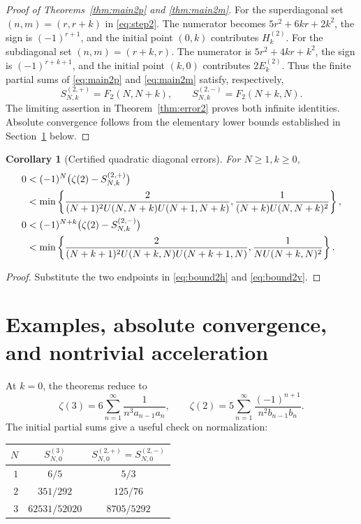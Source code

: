 \documentclass[11pt]{article}
\numberwithin{equation}{section}
\newtheorem{corollary}[theorem]{Corollary}
\theoremstyle{definition}
\theoremstyle{remark}
\newcommand{\HS}[2]{H_{#1}^{(#2)}}
\newcommand{\ES}[1]{E_{#1}^{(2)}}
\newcommand{\Sthree}[2]{S^{(3)}_{#1,#2}}
\newcommand{\Stwop}[2]{S^{(2,+)}_{#1,#2}}
\newcommand{\Stwom}[2]{S^{(2,-)}_{#1,#2}}
\begin{document}
\begin{proof}[Proof of Theorems~\ref{thm:main2p} and \ref{thm:main2m}]
For the superdiagonal set $(n,m)=(r,r+k)$ in \eqref{eq:step2}.
The numerator becomes $5r^2+6kr+2k^2$, the sign is $(-1)^{r+1}$,
and the initial point $(0,k)$ contributes $\HS{k}{2}$.
For the subdiagonal set $(n,m)=(r+k,r)$. The numerator is
$5r^2+4kr+k^2$, the sign is $(-1)^{r+k+1}$, and the initial point
$(k,0)$ contributes $2\ES{k}$.
Thus the finite partial sums of \eqref{eq:main2p} and
\eqref{eq:main2m} satisfy, respectively,
\begin{equation}\label{eq:finite2}
 \Stwop{N}{k}=F_2(N,N+k),\qquad
 \Stwom{N}{k}=F_2(N+k,N).
\end{equation}
The limiting assertion in Theorem~\ref{thm:error2} proves both infinite
identities. Absolute convergence follows from the elementary lower
bounds established in Section~\ref{sec:examples} below.
\end{proof}

\begin{corollary}[Certified quadratic diagonal errors]\label{cor:diag2}
For $N\geq1,k\geq0$,
\begin{align}
0&<(-1)^N\bigl(\zeta(2)-\Stwop{N}{k}\bigr)\notag\\
 &<\min\left\{
 \frac2{(N+1)^2U(N,N+k)U(N+1,N+k)},
 \frac1{(N+k)U(N,N+k)^2}\right\},\label{eq:diagerror2p}\\
0&<(-1)^{N+k}\bigl(\zeta(2)-\Stwom{N}{k}\bigr)\notag\\
 &<\min\left\{
 \frac2{(N+k+1)^2U(N+k,N)U(N+k+1,N)},
 \frac1{NU(N+k,N)^2}\right\}.\label{eq:diagerror2m}
\end{align}
\end{corollary}
\begin{proof}
Substitute the two endpoints in \eqref{eq:bound2h} and \eqref{eq:bound2v}.
\end{proof}

\section{Examples, absolute convergence, and nontrivial acceleration}\label{sec:examples}

At $k=0$, the theorems reduce to
\begin{equation}\label{eq:classicalseries}
 \zeta(3)=6\sum_{n=1}^\infty\frac1{n^3a_{n-1}a_n},\qquad
 \zeta(2)=5\sum_{n=1}^\infty\frac{(-1)^{n+1}}{n^2b_{n-1}b_n}.
\end{equation}
The initial partial sums give a useful check on normalization:
\begin{center}
\begin{tabular}{@{}rcc@{}}
\toprule
$N$ & $\Sthree{N}{0}$ & $\Stwop{N}{0}=\Stwom{N}{0}$\\
\midrule
$1$ & $6/5$ & $5/3$\\
$2$ & $351/292$ & $125/76$\\
$3$ & $62531/52020$ & $8705/5292$\\
\bottomrule
\end{tabular}
\end{center}
\end{document}
